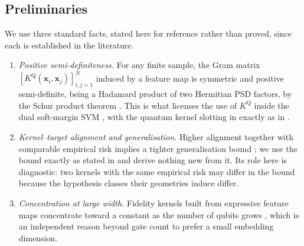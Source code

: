 %
%

\subsection{Preliminaries}

We use three standard facts, stated here for reference rather than proved,
since each is established in the literature.

\begin{enumerate}
  \item[\textbf{(F1)}] \emph{Positive semi-definiteness.} For any finite sample,
    the Gram matrix $[K^{\mathrm{Q}}(\bm{x}_i,\bm{x}_j)]_{i,j=1}^{N}$ induced by
    a feature map is symmetric and positive semi-definite, being a Hadamard
    product of two Hermitian PSD factors, by the Schur product
    theorem \cite{scholkopf2002}. This is what licenses the use of
    $K^{\mathrm{Q}}$ inside the dual soft-margin SVM
    \cite{cortes1995,scholkopf2002}, with the quantum kernel slotting in exactly
    as in \cite{havlicek2019,schuld2019}.
  \item[\textbf{(F2)}] \emph{Kernel--target alignment and generalisation.}
    Higher alignment together with comparable empirical risk implies a tighter
    generalisation bound \cite{cristianini2002,cortes2012}; we use the bound
    exactly as stated in \cite{cortes2012} and derive nothing new from it. Its
    role here is diagnostic: two kernels with the same empirical risk may differ
    in the bound because the hypothesis classes their geometries induce differ.
  \item[\textbf{(F3)}] \emph{Concentration at large width.} Fidelity kernels
    built from expressive feature maps concentrate toward a constant as the
    number of qubits grows \cite{thanasilp2024}, which is an independent reason
    beyond gate count to prefer a small embedding dimension.
\end{enumerate}

